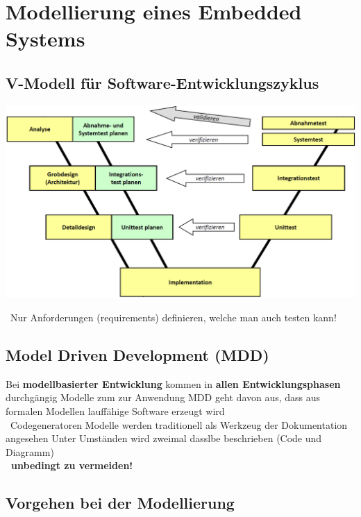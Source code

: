 \section{Modellierung eines Embedded Systems}

\subsection{V-Modell für Software-Entwicklungszyklus}

\begin{center}
    \includegraphics[width=0.7\columnwidth]{images/V_modell.png}
\end{center}

\textrightarrow\ Nur Anforderungen (requirements) definieren, welche man auch testen kann!


\subsection{Model Driven Development (MDD)}

\begin{outline}
    \1 Bei \textbf{modellbasierter Entwicklung} kommen in \textbf{allen Entwicklungsphasen} durchgängig Modelle zum zur Anwendung
    \1 MDD geht davon aus, dass aus formalen Modellen lauffähige Software erzeugt wird \\
        \textrightarrow\ Codegeneratoren
    \1 Modelle werden traditionell als Werkzeug der Dokumentation angesehen
        \2 Unter Umständen wird zweimal dasslbe beschrieben (Code und Diagramm) \\
            \textbf{\textrightarrow\ unbedingt zu vermeiden!}
\end{outline}


\subsection{Vorgehen bei der Modellierung}

